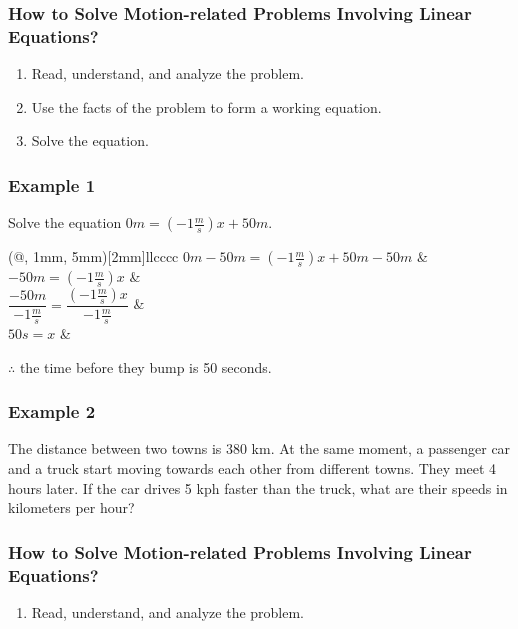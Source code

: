 \documentclass[14pt]{beamer}
\begin{document}
    \begin{frame}
    	\frametitle{How  to Solve Motion-related Problems Involving Linear Equations?}
    	
    	\begin{enumerate}  
    		\item Read, understand, and analyze the problem. 
    		\item Use the facts of the problem to form a working equation.
    		\item Solve the equation.
    	\end{enumerate}  
    \end{frame}

    \begin{frame}
    	\frametitle{Example 1}
    	Solve the equation $ 0 m = \left(-1 \frac{m}{s} \right) x + 50 m $.
    	
    	\begin{TAB}(@, 1mm, 5mm)[2mm]{ll}{cccc}
    		\pause $ 0 m - 50 m = \left(-1 \frac{m}{s} \right) x + 50 m - 50 m $ & \\
    		
    		\pause $ - 50 m = \left(-1 \frac{m}{s} \right) x $ & \\
    		
    		\pause $ \dfrac{- 50 m}{-1 \frac{m}{s}} = \dfrac{\left(-1 \frac{m}{s} \right) x}{-1 \frac{m}{s}} $ & \\
   
    		\pause $ 50 s  = x $ & \\
    	\end{TAB}
    	
    	\pause $ \therefore $ the time before they bump is 50 seconds.
    \end{frame}

\begin{frame}
	\frametitle{Example 2}
	The distance between two towns is 380 km. At the same moment, a passenger
	car and a truck start moving towards each other from different towns. They meet 4
	hours later. If the car drives 5 kph faster than the truck, what are their speeds in
	kilometers per hour?
\end{frame}

\begin{frame}
	\frametitle{How  to Solve Motion-related Problems Involving Linear Equations?}
	
	\begin{enumerate}  
		\item Read, understand, and analyze the problem. 
	\end{enumerate}  
\end{frame}
\end{document}
